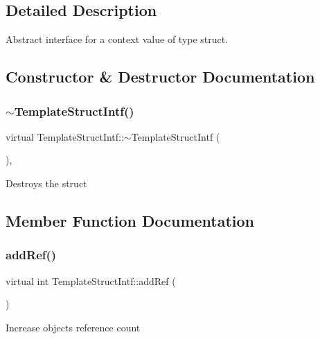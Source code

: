 \subsection{Detailed Description}
Abstract interface for a context value of type struct. 

\subsection{Constructor \& Destructor Documentation}
\mbox{\label{class_template_struct_intf_a54ce5b2065da3e862da316db259cb49d}} 
\subsubsection{\texorpdfstring{$\sim$TemplateStructIntf()}{~TemplateStructIntf()}}
{\footnotesize\ttfamily virtual Template\+Struct\+Intf\+::$\sim$\+Template\+Struct\+Intf (\begin{DoxyParamCaption}{ }\end{DoxyParamCaption})\hspace{0.3cm}{\ttfamily [inline]}, {\ttfamily [virtual]}}

Destroys the struct 

\subsection{Member Function Documentation}
\mbox{\label{class_template_struct_intf_a05fe97ad47633beb326f69686faed581}} 
\subsubsection{\texorpdfstring{addRef()}{addRef()}}
{\footnotesize\ttfamily virtual int Template\+Struct\+Intf\+::add\+Ref (\begin{DoxyParamCaption}{ }\end{DoxyParamCaption})\hspace{0.3cm}{\ttfamily [pure virtual]}}

Increase object\textquotesingle{}s reference count 

